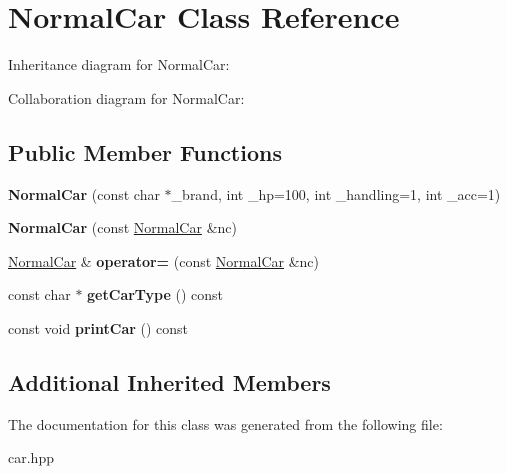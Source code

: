 \hypertarget{classNormalCar}{}\section{Normal\+Car Class Reference}
\label{classNormalCar}


Inheritance diagram for Normal\+Car\+:


Collaboration diagram for Normal\+Car\+:
\subsection*{Public Member Functions}
\begin{DoxyCompactItemize}
\item 
{\bfseries Normal\+Car} (const char $\ast$\+\_\+brand, int \+\_\+hp=100, int \+\_\+handling=1, int \+\_\+acc=1)\hypertarget{classNormalCar_a8342aef3e47d7a3bf60609a4d87d41a9}{}\label{classNormalCar_a8342aef3e47d7a3bf60609a4d87d41a9}

\item 
{\bfseries Normal\+Car} (const \hyperlink{classNormalCar}{Normal\+Car} \&nc)\hypertarget{classNormalCar_ab0779e6a87bbaba64a7311f110f92278}{}\label{classNormalCar_ab0779e6a87bbaba64a7311f110f92278}

\item 
\hyperlink{classNormalCar}{Normal\+Car} \& {\bfseries operator=} (const \hyperlink{classNormalCar}{Normal\+Car} \&nc)\hypertarget{classNormalCar_a56bffcd480c947c38fb73a3f0c4afbf8}{}\label{classNormalCar_a56bffcd480c947c38fb73a3f0c4afbf8}

\item 
const char $\ast$ {\bfseries get\+Car\+Type} () const \hypertarget{classNormalCar_afb6509b931930cfbb5427215914521e8}{}\label{classNormalCar_afb6509b931930cfbb5427215914521e8}

\item 
const void {\bfseries print\+Car} () const \hypertarget{classNormalCar_a853db47a807084a75ecba58d57e1d3ab}{}\label{classNormalCar_a853db47a807084a75ecba58d57e1d3ab}

\end{DoxyCompactItemize}
\subsection*{Additional Inherited Members}


The documentation for this class was generated from the following file\+:\begin{DoxyCompactItemize}
\item 
car.\+hpp\end{DoxyCompactItemize}
